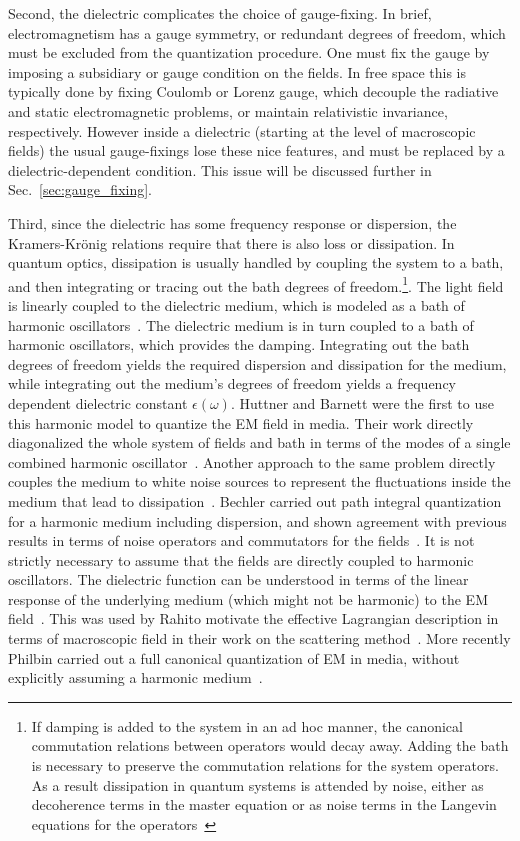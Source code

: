 Second, the dielectric complicates the choice of gauge-fixing.  
In brief, electromagnetism has a gauge symmetry, or redundant degrees of freedom, which must be 
excluded from the quantization procedure.  One must fix the gauge by imposing a subsidiary or gauge condition
on the fields.  In free space this is typically done by fixing Coulomb or Lorenz gauge, which 
decouple the radiative and static electromagnetic problems, or maintain relativistic invariance, respectively.
However inside a dielectric (starting at the level of macroscopic fields) the usual gauge-fixings lose these nice
features, and must be replaced by a dielectric-dependent condition.  
This issue will be discussed further in Sec.~\ref{sec:gauge_fixing}.

Third, since the dielectric has some frequency response or dispersion, the Kramers-Kr\"onig relations 
require that there is also loss or dissipation.  
In  quantum optics, dissipation is usually handled by coupling the system to a bath, and then
integrating or tracing out the bath degrees of freedom.\footnote{If damping is added to the system in an ad hoc
manner, the canonical commutation relations between operators would decay away.  Adding the bath
is necessary to preserve the commutation relations for the system operators.  As a result dissipation in quantum systems 
is attended by noise, either as decoherence terms in the master equation or as noise terms in the Langevin equations for the operators~\cite{GardinerZoller2004}}.
The light field is linearly coupled to the dielectric medium, which is modeled
as a bath of harmonic oscillators~\cite{Huttner1992,Dung1998,Bechler1999}.
The dielectric medium is in turn coupled to a bath of harmonic oscillators, which provides the damping.
Integrating out the bath degrees of freedom yields the required dispersion and dissipation for the medium, 
while integrating out the medium's degrees of freedom yields a frequency dependent dielectric constant $\epsilon(\omega)$.
Huttner and Barnett were the first to use this harmonic model to quantize the EM field in media. Their
work directly diagonalized the whole system of fields and bath in terms of the modes of 
a single combined harmonic oscillator~\cite{Huttner1992}.
Another approach to the same problem directly couples the medium to white noise sources to represent the fluctuations 
inside the medium that lead to dissipation~\cite{Scheel1998,Dung1998,Tip2001}.
Bechler carried out path integral quantization for a harmonic medium 
including dispersion, and shown agreement with previous results in terms 
of noise operators and commutators for the fields~\cite{Bechler1999,Bechler2006}.  
It is not strictly necessary to assume that the fields are directly coupled to harmonic oscillators. 
The dielectric function can be understood in terms of the linear response of the underlying 
medium (which might not be harmonic) to the EM field~\cite{Altland2011}.  
This was used by Rahi\etal to motivate the effective Lagrangian description in terms of macroscopic field in their 
work on the scattering method~\cite{Rahi2009}.  
More recently Philbin carried out a full canonical quantization of EM in media, without explicitly 
assuming a harmonic medium~\cite{Philbin2010}.

